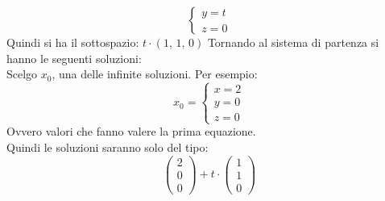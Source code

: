 \documentclass[a4paper,12pt, oneside]{book}
\begin{document}
\begin{esempio}
$$\begin{cases}
y=t\\
z=0
\end{cases}
$$
Quindi si ha il sottospazio: $t\cdot(1,\,1,\,0)$
Tornando al sistema di partenza si hanno le seguenti soluzioni:\\
Scelgo $x_0$, una delle infinite soluzioni. Per esempio:
$$x_0=\begin{cases}
x=2\\
y=0\\
z=0
\end{cases}$$
Ovvero valori che fanno valere la prima equazione.\\
Quindi le soluzioni saranno solo del tipo:
$$
\left(\begin{matrix}
2\\
0\\
0
\end{matrix}\right)+t\cdot
\left(\begin{matrix}
1\\
1\\
0
\end{matrix}\right)
$$
\end{esempio}
\newpage
\end{document}
